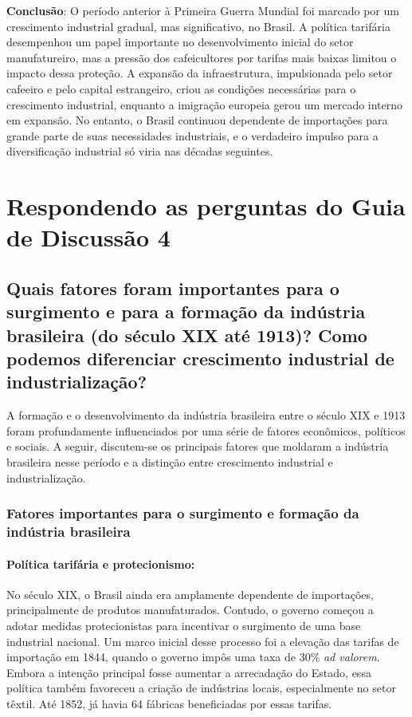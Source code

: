 \documentclass[a4paper,12pt]{article}[abntex2]
\begin{document}
\textbf{Conclusão}: O período anterior à Primeira Guerra Mundial foi marcado por um crescimento industrial gradual, mas significativo, no Brasil. A política tarifária desempenhou um papel importante no desenvolvimento inicial do setor manufatureiro, mas a pressão dos cafeicultores por tarifas mais baixas limitou o impacto dessa proteção. A expansão da infraestrutura, impulsionada pelo setor cafeeiro e pelo capital estrangeiro, criou as condições necessárias para o crescimento industrial, enquanto a imigração europeia gerou um mercado interno em expansão. No entanto, o Brasil continuou dependente de importações para grande parte de suas necessidades industriais, e o verdadeiro impulso para a diversificação industrial só viria nas décadas seguintes.

\newpage
\section{\textbf{Respondendo as perguntas do Guia de Discussão 4}}
\subsection{\textbf{Quais fatores foram importantes para o surgimento e para a formação da indústria brasileira (do século XIX até 1913)? Como podemos diferenciar crescimento industrial de industrialização?}}

A formação e o desenvolvimento da indústria brasileira entre o século XIX e 1913 foram profundamente influenciados por uma série de fatores econômicos, políticos e sociais. A seguir, discutem-se os principais fatores que moldaram a indústria brasileira nesse período e a distinção entre crescimento industrial e industrialização.

\subsubsection{Fatores importantes para o surgimento e formação da indústria brasileira}

\paragraph{Política tarifária e protecionismo:}
No século XIX, o Brasil ainda era amplamente dependente de importações, principalmente de produtos manufaturados. Contudo, o governo começou a adotar medidas protecionistas para incentivar o surgimento de uma base industrial nacional. Um marco inicial desse processo foi a elevação das tarifas de importação em 1844, quando o governo impôs uma taxa de 30\% \textit{ad valorem}. Embora a intenção principal fosse aumentar a arrecadação do Estado, essa política também favoreceu a criação de indústrias locais, especialmente no setor têxtil. Até 1852, já havia 64 fábricas beneficiadas por essas tarifas.
\end{document}
